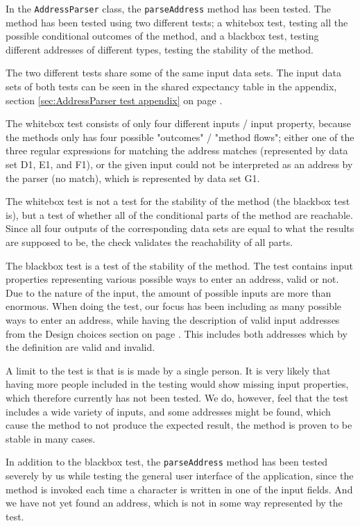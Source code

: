 In the \texttt{AddressParser} class, the \texttt{parseAddress} method has been tested. The method has been tested using two different tests; a whitebox test, testing all the possible conditional outcomes of the method, and a blackbox test, testing different addresses of different types, testing the stability of the method.

The two different tests share some of the same input data sets. The input data sets of both tests can be seen in the shared expectancy table in the appendix, section \ref{sec:AddressParser test appendix} on page \pageref{sec:AddressParser test appendix}.

The whitebox test consists of only four different inputs / input property, because the methods only has four possible "outcomes" / "method flows"; either one of the three regular expressions for matching the address matches (represented by data set D1, E1, and F1), or the given input could not be interpreted as an address by the parser (no match), which is represented by data set G1.

The whitebox test is not a test for the stability of the method (the blackbox test is), but a test of whether all of the conditional parts of the method are reachable. Since all four outputs of the corresponding data sets are equal to what the results are supposed to be, the check validates the reachability of all parts.

The blackbox test is a test of the stability of the method. The test contains input properties representing various possible ways to enter an address, valid or not. Due to the nature of the input, the amount of possible inputs are more than enormous. When doing the test, our focus has been including as many possible ways to enter an address,   while having the description of valid input addresses from the Design choices section on page \pageref{sec: What is a valid address}. This includes both addresses which by the definition are valid and invalid.

A limit to the test is that is is made by a single person. It is very likely that having more people included in the testing would show missing input properties, which therefore currently has not been tested. We do, however, feel that the test includes a wide variety of inputs, and some addresses might be found, which cause the method to not produce the expected result, the method is proven to be stable in many cases.

In addition to the blackbox test, the \texttt{parseAddress} method has been tested severely by us while testing the general user interface of the application, since the method is invoked each time a character is written in one of the input fields. And we have not yet found an address, which is not in some way represented by the test.